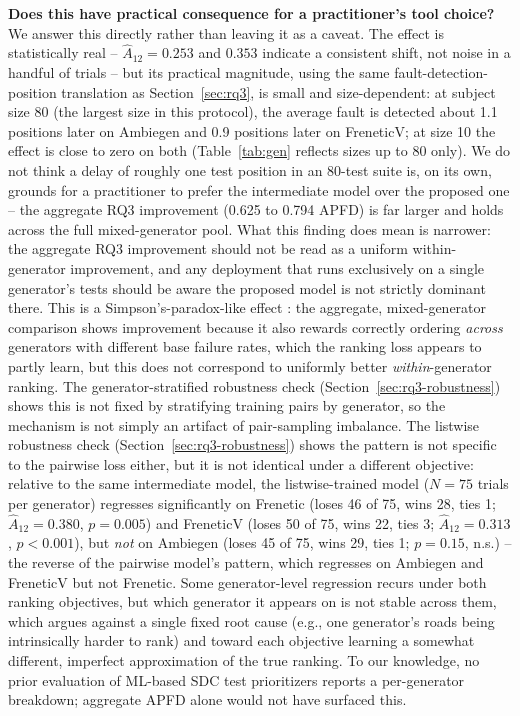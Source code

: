 \documentclass[smallextended]{svjour3}
\begin{document}
\textbf{Does this have practical consequence for a practitioner's tool
choice?} We answer this directly rather than leaving it as a caveat. The
effect is statistically real -- $\hat{A}_{12}=0.253$ and $0.353$ indicate
a consistent shift, not noise in a handful of trials -- but its practical
magnitude, using the same fault-detection-position translation as
Section~\ref{sec:rq3}, is small and size-dependent: at subject size 80
(the largest size in this protocol), the average fault is detected about
1.1 positions later on Ambiegen and 0.9 positions later on FreneticV; at
size 10 the effect is close to zero on both (Table~\ref{tab:gen} reflects
sizes up to 80 only). We do not think a delay of roughly one test
position in an 80-test suite is, on its own, grounds for a practitioner
to prefer the intermediate model over the proposed one -- the aggregate
RQ3 improvement (0.625 to 0.794 APFD) is far larger and holds across the
full mixed-generator pool. What this finding does mean is narrower: the
aggregate RQ3 improvement should not be read as a uniform
within-generator improvement, and any deployment that runs exclusively on
a single generator's tests should be aware the proposed model is not
strictly dominant there.
This is a Simpson's-paradox-like effect \citep{simpson1951interpretation}: the
aggregate, mixed-generator comparison shows improvement because it also
rewards correctly ordering \emph{across} generators with different base
failure rates, which the ranking loss appears to partly learn, but this
does not correspond to uniformly better \emph{within}-generator ranking.
The generator-stratified robustness check (Section~\ref{sec:rq3-robustness})
shows this is not fixed by stratifying training pairs by generator, so the
mechanism is not simply an artifact of pair-sampling imbalance. The
listwise robustness check (Section~\ref{sec:rq3-robustness}) shows the
pattern is not specific to the pairwise loss either, but it is not
identical under a different objective: relative to the same intermediate
model, the listwise-trained model ($N=75$ trials per generator) regresses
significantly on Frenetic (loses 46 of 75, wins 28, ties 1;
$\hat{A}_{12}=0.380$, $p=0.005$) and FreneticV (loses 50 of 75, wins 22,
ties 3; $\hat{A}_{12}=0.313$, $p<0.001$), but \emph{not} on Ambiegen (loses
45 of 75, wins 29, ties 1; $p=0.15$, n.s.) -- the reverse of the pairwise
model's pattern, which regresses on Ambiegen and FreneticV but not
Frenetic. Some generator-level regression recurs under both ranking
objectives, but which generator it appears on is not stable across them,
which argues against a single fixed root cause (e.g., one generator's
roads being intrinsically harder to rank) and toward each objective
learning a somewhat different, imperfect approximation of the true
ranking. To our
knowledge, no prior evaluation of ML-based SDC test prioritizers reports a
per-generator breakdown; aggregate APFD alone would not have surfaced this.
\end{document}
